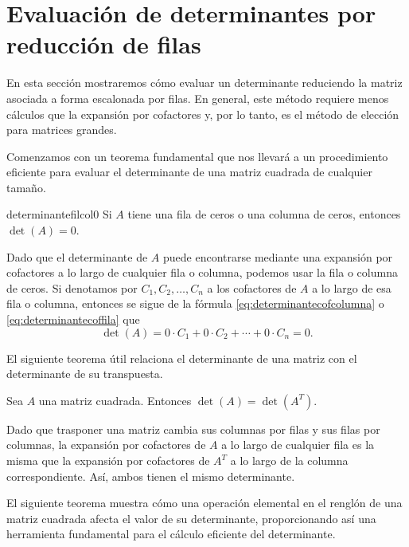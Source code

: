\section{Evaluación de determinantes por reducción de filas}

En esta sección mostraremos cómo evaluar un determinante reduciendo la matriz asociada a forma escalonada por filas. En general, este método requiere menos cálculos que la expansión por cofactores y, por lo tanto, es el método de elección para matrices grandes.

Comenzamos con un teorema fundamental que nos llevará a un procedimiento eficiente para evaluar el determinante de una matriz cuadrada de cualquier tamaño.

\begin{theorem}{}{determinantefilcol0}
    Si $A$ tiene una fila de ceros o una columna de ceros, entonces $\det(A) = 0$.

    \tcblower
    \demostracion Dado que el determinante de $A$ puede encontrarse mediante una expansión por cofactores a lo largo de cualquier fila o columna, podemos usar la fila o columna de ceros. Si denotamos por $C_1, C_2, \dots, C_n$ a los cofactores de $A$ a lo largo de esa fila o columna, entonces se sigue de la fórmula \eqref{eq:determinantecofcolumna} o \eqref{eq:determinantecoffila} que
    $$\det(A) = 0 \cdot C_1 + 0 \cdot C_2 + \cdots + 0 \cdot C_n = 0.$$
\end{theorem}

El siguiente teorema útil relaciona el determinante de una matriz con el determinante de su transpuesta.

\begin{theorem}{}{}
    Sea $A$ una matriz cuadrada. Entonces $\det(A) = \det\left(A^T\right)$.

    \tcblower
    \demostracion Dado que trasponer una matriz cambia sus columnas por filas y sus filas por columnas, la expansión por cofactores de $A$ a lo largo de cualquier fila es la misma que la expansión por cofactores de $A^T$ a lo largo de la columna correspondiente. Así, ambos tienen el mismo determinante.
\end{theorem}

El siguiente teorema muestra cómo una operación elemental en el renglón de una matriz cuadrada afecta el valor de su determinante, proporcionando así una herramienta fundamental para el cálculo eficiente del determinante.

